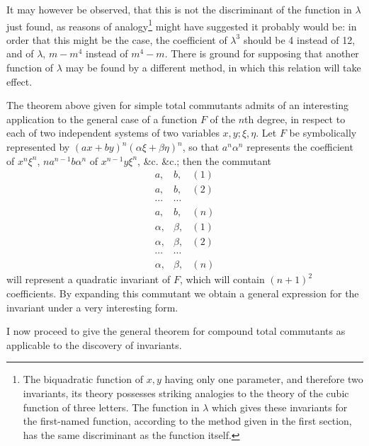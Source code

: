 \documentclass[11pt]{article}
\newcommand{\sourcepage}[1]{\marginpar{\scriptsize p.~#1}}
\begin{document}
It may however be observed, that this is not the discriminant of the function in $\lambda$ just found, as reasons of analogy\footnote{The biquadratic function of $x,y$ having only one parameter, and therefore two invariants, its theory possesses striking analogies to the theory of the cubic function of three letters. The function in $\lambda$ which gives these invariants for the first-named function, according to the method given in the first section, has the same discriminant as the function itself.} might have suggested it probably would be: in order that this might be the case, the coefficient of $\lambda^3$ should be 4 instead of 12, and of $\lambda$, $m-m^4$ instead of $m^4-m$. There is ground for supposing that another function of $\lambda$ may be found by a different method, in which this relation will take effect.

The theorem above given for simple total commutants admits of an interesting application to the general case of a function $F$ of the $n$th degree, in respect to each of two independent systems of two variables $x,y;\xi,\eta$. Let $F$ be symbolically represented by $(ax+by)^n(\alpha\xi+\beta\eta)^n$, so that $a^n\alpha^n$ represents the coefficient of $x^n\xi^n$, $na^{n-1}b\alpha^n$ of $x^{n-1}y\xi^n$, \&c. \&c.; then the commutant
\[
\begin{array}{ccr}
a,&b,&(1)\\
a,&b,&(2)\\
\cdots&\cdots&\\
a,&b,&(n)\\
\alpha,&\beta,&(1)\\
\alpha,&\beta,&(2)\\
\cdots&\cdots&\\
\alpha,&\beta,&(n)
\end{array}
\]
will represent a quadratic invariant of $F$, which will contain $(n+1)^2$ coefficients. By expanding this commutant we obtain a general expression for the invariant under a very interesting form.

\sourcepage{312}
I now proceed to give the general theorem for compound total commutants as applicable to the discovery of invariants.
\end{document}
